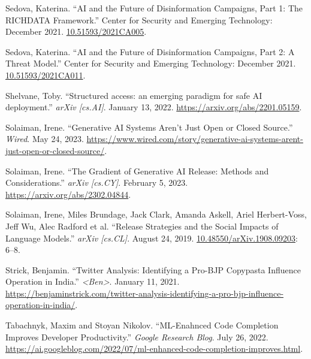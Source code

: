 \documentclass{article}
\begin{document}
\begin{thebibliography}{9}
  Sedova, Katerina. ``AI and the Future of Disinformation Campaigns, Part 1: The RICHDATA Framework.'' Center for Security and Emerging Technology: December 2021. \href{https://cset.georgetown.edu/publication/ai-and-the-future-of-disinformation-campaigns/}{10.51593/2021CA005}.

  Sedova, Katerina. ``AI and the Future of Disinformation Campaigns, Part 2: A Threat Model.'' Center for Security and Emerging Technology: December 2021. \href{https://cset.georgetown.edu/publication/ai-and-the-future-of-disinformation-campaigns-2/}{10.51593/2021CA011}.

  Shelvane, Toby. ``Structured access: an emerging paradigm for safe AI deployment.'' \textit{arXiv [cs.AI]}. January 13, 2022. \href{https://arxiv.org/abs/2201.05159}{https://arxiv.org/abs/2201.05159}. 

  Solaiman, Irene. ``Generative AI Systems Aren't Just Open or Closed Source.'' \textit{Wired}. May 24, 2023. \href{https://www.wired.com/story/generative-ai-systems-arent-just-open-or-closed-source/}{https://www.wired.com/story/generative-ai-systems-arent-just-open-or-closed-source/}. 

  Solaiman, Irene. ``The Gradient of Generative AI Release: Methods and Considerations.'' \textit{arXiv [cs.CY]}. February 5, 2023. \href{https://arxiv.org/abs/2302.04844}{https://arxiv.org/abs/2302.04844}. 

  Solaiman, Irene, Miles Brundage, Jack Clark, Amanda Askell, Ariel Herbert-Voss, Jeff Wu, Alec Radford et al. ``Release Strategies and the Social Impacts of Language Models.'' \textit{arXiv [cs.CL]}. August 24, 2019. \href{https://arxiv.org/abs/1908.09203}{10.48550/arXiv.1908.09203}: 6–8.

  Strick, Benjamin. ``Twitter Analysis: Identifying a Pro-BJP Copypasta Influence Operation in India.'' \textit{<Ben>}. January 11, 2021. \href{https://benjaminstrick.com/twitter-analysis-identifying-a-pro-bjp-influence-operation-in-india/}{https://benjaminstrick.com/twitter-analysis-identifying-a-pro-bjp-influence-operation-in-india/}. 

  Tabachnyk, Maxim and Stoyan Nikolov. ``ML-Enahnced Code Completion Improves Developer Productivity.'' \textit{Google Research Blog}. July 26, 2022. \href{https://ai.googleblog.com/2022/07/ml-enhanced-code-completion-improves.html}{https://ai.googleblog.com/2022/07/ml-enhanced-code-completion-improves.html}. 


\end{thebibliography}
\end{document}

